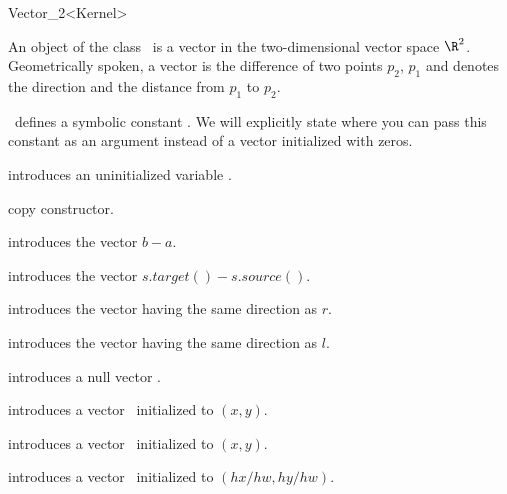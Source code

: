\begin{ccRefClass} {Vector_2<Kernel>}

\ccDefinition

An object of the class \ccRefName\ is a vector in the two-dimensional 
vector space $\R^2$. Geometrically spoken, a vector is the difference
of two points $p_2$, $p_1$ and denotes the direction and the distance
from   $p_1$ to $p_2$. 

\cgal\ defines a symbolic constant . We 
will explicitly state where you can pass this constant as an argument
instead of a vector initialized with zeros.

\ccTypes
{}
\ccThreeToTwo


\ccCreation
{}


\ccHidden{}
             {introduces an uninitialized variable \ccVar.}

\ccHidden {}
            {copy constructor.}

            {introduces the vector $b-a$.}

            {introduces the vector $s.target()-s.source()$.}

            {introduces the vector having the same direction as $r$.}

            {introduces the vector having the same direction as $l$.}

            {introduces a null vector \ccVar.}

            {introduces a vector \ccVar\ initialized to $(x,y)$.}

            {introduces a vector \ccVar\ initialized to $(x,y)$.}

            {introduces a vector \ccVar\ initialized to $(hx/hw,hy/hw)$.
              }


\end{ccRefClass}
